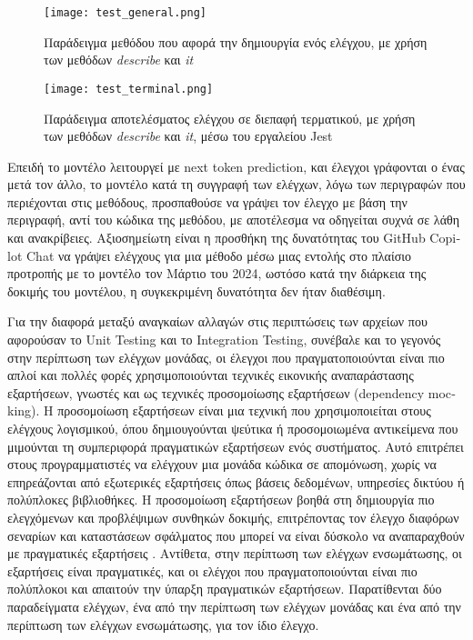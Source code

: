 \begin{figure}[H]
  \begin{center}
    \texttt{[image: test\_general.png]}
    \caption{Παράδειγμα μεθόδου που αφορά την δημιουργία ενός ελέγχου,
      με χρήση των μεθόδων \textit{\textlatin{describe}} και
    \textit{\textlatin{it}}}
  \end{center}
  \label{fig:TestGeneral}
\end{figure}

\begin{figure}[H]
  \begin{center}
    \texttt{[image: test\_terminal.png]}
    \caption{Παράδειγμα αποτελέσματος ελέγχου σε διεπαφή τερματικού, με
      χρήση των μεθόδων \textit{\textlatin{describe}} και
    \textit{\textlatin{it}}, μέσω του εργαλείου \textlatin{Jest}}
  \end{center}
  \label{fig:TestGeneralTerminal}
\end{figure}

Επειδή το μοντέλο λειτουργεί με \textlatin{next token prediction}, και
έλεγχοι γράφονται ο ένας μετά τον άλλο, το μοντέλο κατά τη συγγραφή των
ελέγχων, λόγω των περιγραφών που περιέχονται στις μεθόδους, προσπαθούσε
να γράψει τον έλεγχο με βάση την περιγραφή, αντί του κώδικα της μεθόδου,
με αποτέλεσμα να οδηγείται συχνά σε λάθη και ανακρίβειες. Αξιοσημείωτη
είναι η προσθήκη της δυνατότητας του \textlatin{GitHub Copilot Chat} να
γράψει ελέγχους για μια μέθοδο μέσω μιας εντολής στο πλαίσιο προτροπής
με το μοντέλο \cite{copilotchattips} τον Μάρτιο του 2024, ωστόσο κατά
την διάρκεια της δοκιμής του μοντέλου, η συγκεκριμένη δυνατότητα δεν
ήταν διαθέσιμη.

Για την διαφορά μεταξύ αναγκαίων αλλαγών στις περιπτώσεις των αρχείων
που αφορούσαν το \textlatin{Unit Testing} και το \textlatin{Integration
Testing}, συνέβαλε και το γεγονός στην περίπτωση των ελέγχων μονάδας,
οι έλεγχοι που πραγματοποιούνται είναι πιο απλοί και πολλές φορές
χρησιμοποιούνται τεχνικές εικονικής αναπαράστασης εξαρτήσεων, γνωστές
και ως τεχνικές προσομοίωσης εξαρτήσεων (\textlatin{dependency
mocking}). Η προσομοίωση εξαρτήσεων είναι μια τεχνική που
χρησιμοποιείται στους ελέγχους λογισμικού, όπου δημιουγούνται ψεύτικα ή
προσομοιωμένα αντικείμενα που μιμούνται τη συμπεριφορά πραγματικών
εξαρτήσεων ενός συστήματος. Αυτό επιτρέπει στους προγραμματιστές να
ελέγχουν μια μονάδα κώδικα σε απομόνωση, χωρίς να επηρεάζονται από
εξωτερικές εξαρτήσεις όπως βάσεις δεδομένων, υπηρεσίες δικτύου ή
πολύπλοκες βιβλιοθήκες. Η προσομοίωση εξαρτήσεων βοηθά στη δημιουργία
πιο ελεγχόμενων και προβλέψιμων συνθηκών δοκιμής, επιτρέποντας τον
έλεγχο διαφόρων σεναρίων και καταστάσεων σφάλματος που μπορεί να είναι
δύσκολο να αναπαραχθούν με πραγματικές εξαρτήσεις
\cite{freeman2009growing}. Αντίθετα, στην περίπτωση των ελέγχων
ενσωμάτωσης, οι εξαρτήσεις είναι πραγματικές, και οι ελέγχοι που
πραγματοποιούνται είναι πιο πολύπλοκοι και απαιτούν την ύπαρξη
πραγματικών εξαρτήσεων. Παρατίθενται δύο παραδείγματα ελέγχων, ένα από την
περίπτωση των ελέγχων μονάδας και ένα από την περίπτωση των ελέγχων
ενσωμάτωσης, για τον ίδιο έλεγχο.

